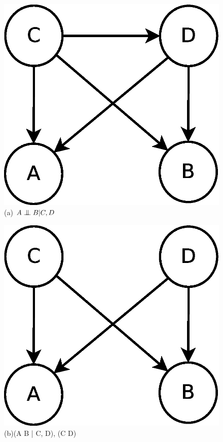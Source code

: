 \documentclass[fleqn]{article}
\newcommand{\bigCI}{\mathrel{\text{\scalebox{1.07}{$\perp\mkern-10mu\perp$}}}}
\begin{document}
\begin{figure}[!ht]
\centering
\includegraphics[scale=0.3]{./HW1_diagrams_3a}
\caption{(a) $A \bigCI B | C, D$}
\end{figure}

\begin{figure}[!ht]
\centering
\includegraphics[scale=0.3]{./HW1_diagrams_3b}
\caption{(b)(A \bigCI B | C, D), (C \bigCI D) }
\end{figure}
\end{document}
